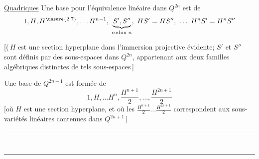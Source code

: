 \uline{Quadriques} \quad Une base pour l'équivalence linéaire dans $Q^{2n}$ est  de
\[
1,H,H^{\unsure{2|7}},\ldots H^{n-1},\
\underbrace{S',S''}_{\text{codim }n},\
HS'=HS'',\ \ldots\ H^{n}S'=H^{n}S''
\]

[(\,$H$ est une section hyperplane dans l'immersion projective évidente; $S'$ et $S''$ sont définis par des sous-espaces   dans $Q^{2n}$, appartenant aux deux familles algébriques distinctes de tels sous-espaces\,]

Une base de $Q^{2n+1}$ est formée de
\[
1,H,\ldots H^{n},\frac{H^{n+1}}{2},\ldots,\frac{H^{2n+1}}{2}
\]
[où $H$ est une section hyperplane, et où les  $\frac{H^{n+1}}{2}\ldots\frac{H^{2n+1}}{2}$ correspondent aux sous-variétés linéaires contenues dans $Q^{2n+1}$\,]

\begin{center}\rule{.23\linewidth}{.4pt}\\[-.65em]\rule{.17\linewidth}{.4pt}\end{center}
